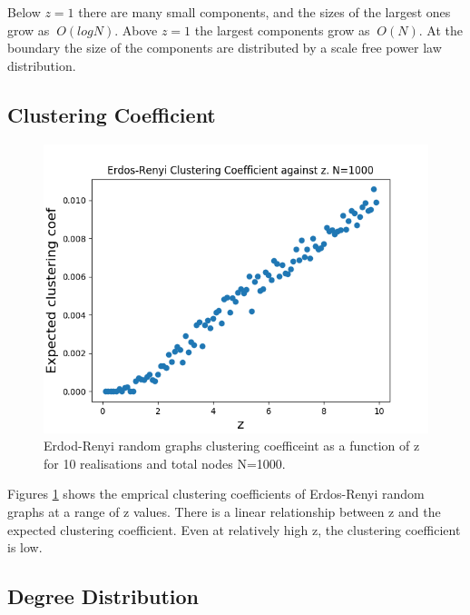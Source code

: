 \documentclass{article}
\begin{document}
Below $z=1$ there are many small components, and the sizes of the largest ones grow as $~O(logN)$. Above $z=1$ the largest components grow as $~O(N)$. At the boundary the size of the components are distributed by a scale free power law distribution.

\subsection{Clustering Coefficient}

\begin{figure}[H]
\includegraphics[scale=0.8]{clustering_a.png} 
\caption{Erdod-Renyi random graphs clustering coefficeint as a function of z for 10 realisations and total nodes N=1000.} 
\label{fig:clustering}
\end{figure}

Figures \ref{fig:clustering} shows the emprical clustering coefficients of Erdos-Renyi random graphs at a range of z values. There is a linear relationship between z and the expected clustering coefficient. Even at relatively high z, the clustering coefficient is low. 

\subsection{Degree Distribution}
\end{document}
